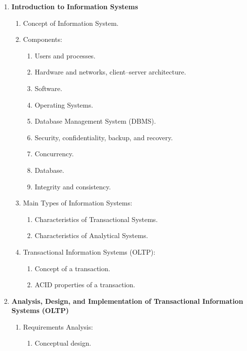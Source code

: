 \documentclass[12pt,a4paper]{article}
\begin{document}
\begin{enumerate}
    \item \textbf{Introduction to Information Systems}
    \begin{enumerate}[label*=\arabic*.]
        \item Concept of Information System.
        \item Components:
        \begin{enumerate}[label*=\arabic*.]
            \item Users and processes.
            \item Hardware and networks, client–server architecture.
            \item Software.
            \item Operating Systems.
            \item Database Management System (DBMS).
            \item Security, confidentiality, backup, and recovery.
            \item Concurrency.
            \item Database.
            \item Integrity and consistency.
        \end{enumerate}
        \item Main Types of Information Systems:
        \begin{enumerate}[label*=\arabic*.]
            \item Characteristics of Transactional Systems.
            \item Characteristics of Analytical Systems.
        \end{enumerate}
        \item Transactional Information Systems (OLTP):
        \begin{enumerate}[label*=\arabic*.]
            \item Concept of a transaction.
            \item ACID properties of a transaction.
        \end{enumerate}
    \end{enumerate}
    \item \textbf{Analysis, Design, and Implementation of Transactional Information Systems (OLTP)}
    \begin{enumerate}[label*=\arabic*.]
        \item Requirements Analysis:
        \begin{enumerate}[label*=\arabic*.]
            \item Conceptual design.

\end{enumerate}
\end{enumerate}
\end{enumerate}
\end{document}
